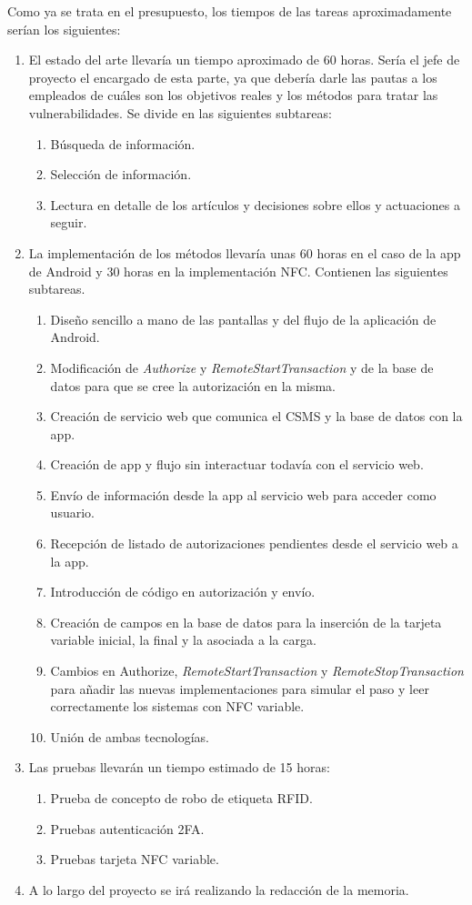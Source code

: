 \documentclass[12pt,a4paper,onecolumn,oneside]{report}
\begin{document}
Como ya se trata en el presupuesto, los tiempos de las tareas aproximadamente serían los siguientes:
\begin{enumerate}
\item El estado del arte llevaría un tiempo aproximado de 60 horas. Sería el jefe de proyecto el encargado de esta parte, ya que debería darle las pautas a los empleados de cuáles son los objetivos reales y los métodos para tratar las vulnerabilidades. Se divide en las siguientes subtareas:
\begin{enumerate}
\item Búsqueda de información.
\item Selección de información.
\item Lectura en detalle de los artículos y decisiones sobre ellos y actuaciones a seguir.
\end{enumerate}
\item La implementación de los métodos llevaría unas 60 horas en el caso de la app de Android y 30 horas en la implementación NFC. Contienen las siguientes subtareas.
\begin{enumerate}
\item Diseño sencillo a mano de las pantallas y del flujo de la aplicación de Android.
\item Modificación de \textit{Authorize} y \textit{RemoteStartTransaction} y de la base de datos para que se cree la autorización en la misma.
\item Creación de servicio web que comunica el CSMS y la base de datos con la app.
\item Creación de app y flujo sin interactuar todavía con el servicio web.
\item Envío de información desde la app al servicio web para acceder como usuario.
\item Recepción de listado de autorizaciones pendientes desde el servicio web a la app.
\item Introducción de código en autorización y envío.
\item Creación de campos en la base de datos para la inserción de la tarjeta variable inicial, la final y la asociada a la carga.
\item Cambios en Authorize, \textit{RemoteStartTransaction} y \textit{RemoteStopTransaction} para añadir las nuevas implementaciones para simular el paso y leer correctamente los sistemas con NFC variable.
\item Unión de ambas tecnologías.
\end{enumerate}
\item Las pruebas llevarán un tiempo estimado de 15 horas:
\begin{enumerate}
\item Prueba de concepto de robo de etiqueta RFID.
\item Pruebas autenticación 2FA.
\item Pruebas tarjeta NFC variable.
\end{enumerate}
\item A lo largo del proyecto se irá realizando la redacción de la memoria.
\end{enumerate}
\end{document}
